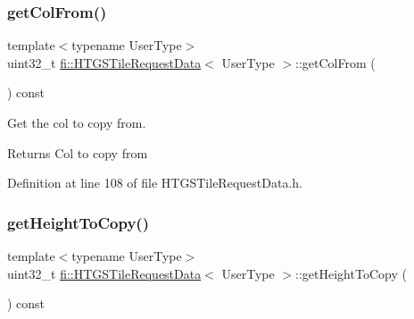 \mbox{\label{classfi_1_1HTGSTileRequestData_ab377108a14549d1bb0e6c3ace7a1c3ab}} 
\subsubsection{\texorpdfstring{get\+Col\+From()}{getColFrom()}}
{\footnotesize\ttfamily template$<$typename User\+Type$>$ \\
uint32\+\_\+t \hyperlink{classfi_1_1HTGSTileRequestData}{fi\+::\+H\+T\+G\+S\+Tile\+Request\+Data}$<$ User\+Type $>$\+::get\+Col\+From (\begin{DoxyParamCaption}{ }\end{DoxyParamCaption}) const\hspace{0.3cm}{\ttfamily [inline]}}



Get the col to copy from. 

\begin{DoxyReturn}{Returns}
Col to copy from 
\end{DoxyReturn}


Definition at line 108 of file H\+T\+G\+S\+Tile\+Request\+Data.\+h.

\mbox{\label{classfi_1_1HTGSTileRequestData_ab462c8ff5dd1a961edb22d854095018a}} 
\subsubsection{\texorpdfstring{get\+Height\+To\+Copy()}{getHeightToCopy()}}
{\footnotesize\ttfamily template$<$typename User\+Type$>$ \\
uint32\+\_\+t \hyperlink{classfi_1_1HTGSTileRequestData}{fi\+::\+H\+T\+G\+S\+Tile\+Request\+Data}$<$ User\+Type $>$\+::get\+Height\+To\+Copy (\begin{DoxyParamCaption}{ }\end{DoxyParamCaption}) const\hspace{0.3cm}{\ttfamily [inline]}}



